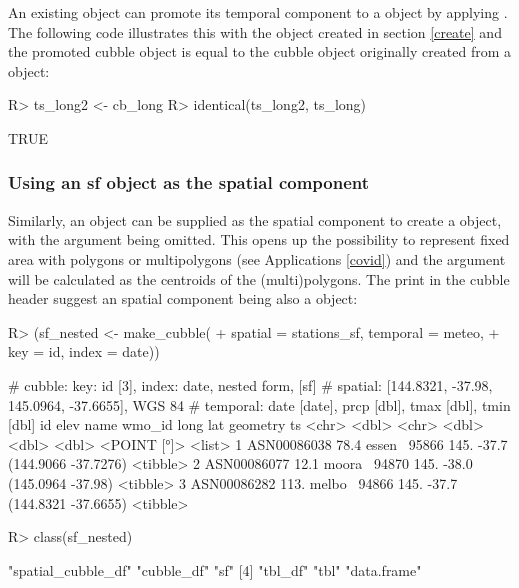 \documentclass[
  shortnames]{jss}
\begin{document}
An existing  object can promote its temporal component to a  object by applying . The following code illustrates this with the object  created in section \ref{create} and the promoted cubble object is equal to the cubble object originally created from a  object:

\begin{CodeChunk}
\begin{CodeInput}
R> ts_long2 <- cb_long %
R> identical(ts_long2, ts_long)
\end{CodeInput}
\begin{CodeOutput}
[1] TRUE
\end{CodeOutput}
\end{CodeChunk}

\hypertarget{using-an-sf-object-as-the-spatial-component}{%
\subsubsection{Using an sf object as the spatial component}\label{using-an-sf-object-as-the-spatial-component}}

Similarly, an  object can be supplied as the spatial component to create a  object, with the  argument being omitted. This opens up the possibility to represent fixed area with polygons or multipolygons (see Applications \ref{covid}) and the  argument will be calculated as the centroids of the (multi)polygons. The \code{[sf]} print in the cubble header suggest an spatial component being also a  object:

\begin{CodeChunk}
\begin{CodeInput}
R> (sf_nested <- make_cubble(
+   spatial = stations_sf, temporal = meteo, 
+   key = id, index = date))
\end{CodeInput}
\begin{CodeOutput}
# cubble:   key: id [3], index: date, nested form, [sf]
# spatial:  [144.8321, -37.98, 145.0964, -37.6655], WGS 84
# temporal: date [date], prcp [dbl], tmax [dbl], tmin [dbl]
  id           elev name   wmo_id  long   lat            geometry ts      
  <chr>       <dbl> <chr>   <dbl> <dbl> <dbl>         <POINT [°]> <list>  
1 ASN00086038  78.4 essen~  95866  145. -37.7 (144.9066 -37.7276) <tibble>
2 ASN00086077  12.1 moora~  94870  145. -38.0   (145.0964 -37.98) <tibble>
3 ASN00086282 113.  melbo~  94866  145. -37.7 (144.8321 -37.6655) <tibble>
\end{CodeOutput}
\begin{CodeInput}
R> class(sf_nested)
\end{CodeInput}
\begin{CodeOutput}
[1] "spatial_cubble_df" "cubble_df"         "sf"               
[4] "tbl_df"            "tbl"               "data.frame"       
\end{CodeOutput}
\end{CodeChunk}
\end{document}

